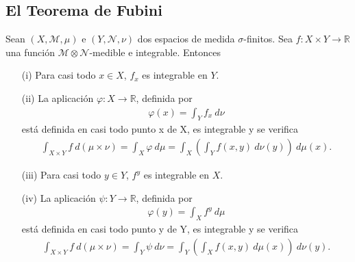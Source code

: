 \subsection{El Teorema de Fubini}

\begin{teo}
    Sean $(X, \mathcal{M}, \mu)$ e $(Y, \mathcal{N}, \nu)$ dos espacios de medida $\sigma$-finitos. Sea $f: X \times Y \longrightarrow \mathbb{R}$ una función $\mathcal{M} \otimes \mathcal{N}$-medible e integrable. Entonces
    \begin{enumerate}
        \item[(i)] Para casi todo $x \in X$, $f_x$ es integrable en $Y$.
        \item[(ii)] La aplicación $\varphi: X \longrightarrow \mathbb{R}$, definida por
              \begin{align*}
                  \varphi(x) = \int_{Y}{f_x \ d\nu}
              \end{align*}
              está definida en casi todo punto x de X, es integrable y se verifica
              \begin{align*}
                  \int_{X \times Y}{f \ d(\mu \times \nu)} = \int_{X}{\varphi \ d\mu} = \int_{X}\left( \int_{Y}{f(x,y) \ d\nu(y)}\right) \ d\mu(x).
              \end{align*}
        \item[(iii)] Para casi todo $y \in Y$, $f^y$ es integrable en $X$.
        \item[(iv)] La aplicación $\psi: Y \longrightarrow \mathbb{R}$, definida por
              \begin{align*}
                  \varphi(y) = \int_{X}{f^y \ d\mu}
              \end{align*}
              está definida en casi todo punto y de Y, es integrable  y se verifica
              \begin{align*}
                  \int_{X \times Y}{f \ d(\mu \times \nu)} = \int_{Y}{\psi \ d\nu} = \int_{Y}\left( \int_{X}{f(x,y) \ d\mu(x)}\right) \ d\nu(y).
              \end{align*}
    \end{enumerate}
\end{teo}

